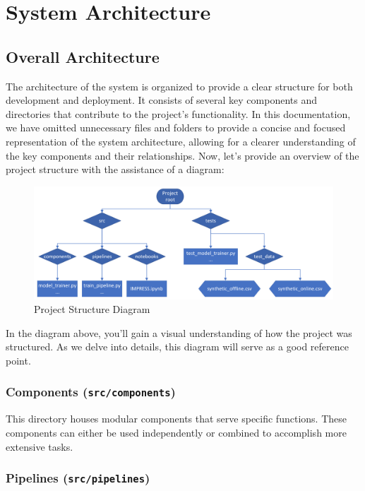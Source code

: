\documentclass{report}
\begin{document}
\chapter{System Architecture}
\section{Overall Architecture}

The architecture of the system is organized to provide a clear structure for both development and deployment. It consists of several key components and directories that contribute to the project's functionality. In this documentation, we have omitted unnecessary files and folders to provide a concise and focused representation of the system architecture, allowing for a clearer understanding of the key components and their relationships.
Now, let's provide an overview of the project structure with the assistance of a diagram:

\begin{figure}[h]
\centering
\includegraphics[width=\textwidth]{System_architecture.png}
\caption{Project Structure Diagram}
\label{fig:system-architecture}
\end{figure}

In the diagram above, you'll gain a visual understanding of how the project was structured. As we delve into details, this diagram will serve as a good reference point.
\subsection{Components (\texttt{src/components})}

This directory houses modular components that serve specific functions. These components can either be used independently or combined to accomplish more extensive tasks.

\subsection{Pipelines (\texttt{src/pipelines})}
\end{document}

